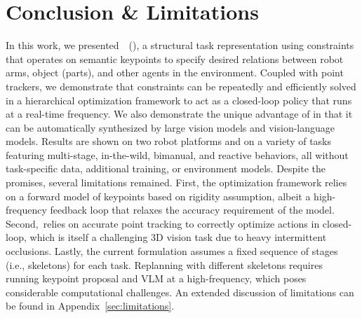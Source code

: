 \section{Conclusion \& Limitations}
In this work, we presented~\algname~(\algabrvname), a structural task representation using constraints that operates on semantic keypoints to specify desired relations between robot arms, object (parts), and other agents in the environment.
Coupled with point trackers, we demonstrate that \algabrvname constraints can be repeatedly and efficiently solved in a hierarchical optimization framework to act as a closed-loop policy that runs at a real-time frequency.
We also demonstrate the unique advantage of \algabrvname in that it can be automatically synthesized by large vision models and vision-language models.
Results are shown on two robot platforms and on a variety of tasks featuring multi-stage, in-the-wild, bimanual, and reactive behaviors, all without task-specific data, additional training, or environment models.
Despite the promises, several limitations remained.
First, the optimization framework relies on a forward model of keypoints based on rigidity assumption, albeit a high-frequency feedback loop that relaxes the accuracy requirement of the model.
Second,~\algabrvname relies on accurate point tracking to correctly optimize actions in closed-loop, which is itself a challenging 3D vision task due to heavy intermittent occlusions.
Lastly, the current formulation assumes a fixed sequence of stages (i.e., skeletons) for each task.
Replanning with different skeletons requires running keypoint proposal and VLM at a high-frequency,
which poses considerable computational challenges.
An extended discussion of limitations can be found in Appendix~\ref{sec:limitations}.

\label{sec:conclusion}

